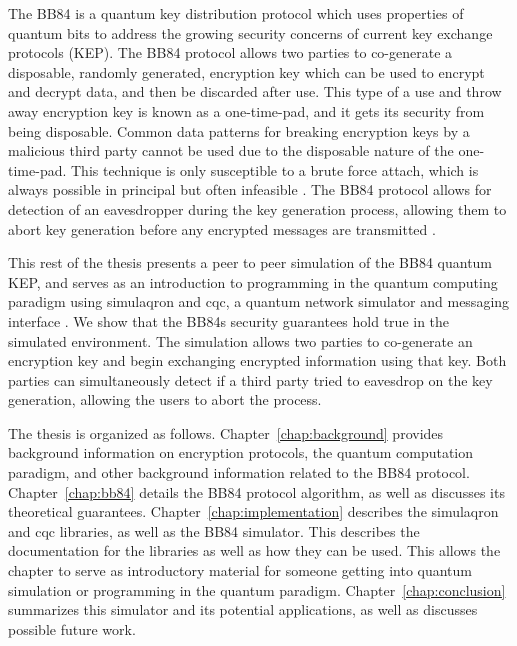 The BB84 is a quantum key distribution protocol which uses properties of quantum bits to address the growing security concerns of current key exchange protocols (KEP).
The BB84 protocol allows two parties to co-generate a disposable, randomly generated, encryption key which can be used to encrypt and decrypt data, and then be discarded after use.
This type of a use and throw away encryption key is known as a one-time-pad, and it gets its security from being disposable.
Common data patterns for breaking encryption keys by a malicious third party cannot be used due to the disposable nature of the one-time-pad.
This technique is only susceptible to a brute force attach, which is always possible in principal but often infeasible \cite{cryptography}.
The BB84 protocol allows for detection of an eavesdropper during the key generation process, allowing them to abort key generation before any encrypted messages are transmitted \cite{qcftgu}.

This rest of the thesis presents a peer to peer simulation of the BB84 quantum KEP, and serves as an introduction to programming in the quantum computing paradigm using simulaqron and cqc, a quantum network simulator and messaging interface \cite{simulaqron}.
We show that the BB84s security guarantees hold true in the simulated environment.
The simulation allows two parties to co-generate an encryption key and begin exchanging encrypted information using that key.
Both parties can simultaneously detect if a third party tried to eavesdrop on the key generation, allowing the users to abort the process. 

The thesis is organized as follows.
Chapter~\ref{chap:background} provides background information on encryption protocols, the quantum computation paradigm, and other background information related to the BB84 protocol. 
Chapter~\ref{chap:bb84} details the BB84 protocol algorithm, as well as discusses its theoretical guarantees.
Chapter~\ref{chap:implementation} describes the simulaqron and cqc libraries, as well as the BB84 simulator.
This describes the documentation for the libraries as well as how they can be used.
This allows the chapter to serve as introductory material for someone getting into quantum simulation or programming in the quantum paradigm.
Chapter~\ref{chap:conclusion} summarizes this simulator and its potential applications, as well as discusses possible future work.

